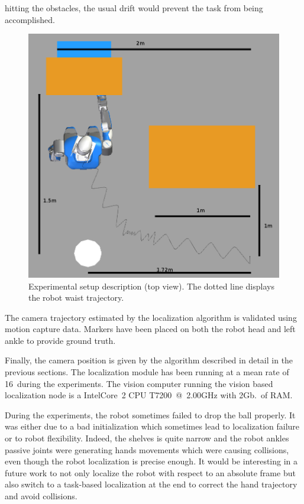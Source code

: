 hitting the obstacles, the usual drift would prevent the task from
being accomplished.
%
\begin{figure}[ht!]
  \begin{center}
    \includegraphics[width=\linewidth]{images/dimensions.png}
  \end{center}
  \caption{Experimental setup description (top view). The dotted line displays the robot waist trajectory.\label{fig:xp_setup_dim}}
\end{figure}
%
The camera trajectory estimated by the localization algorithm is validated using motion capture data. Markers have been placed on both the robot head and left ankle to provide ground truth.

Finally, the camera position is given by the algorithm described in detail in the previous sections. The localization module has been running at a mean rate of 16\hertz~during the experiments. The
vision computer running the vision based localization node is a Intel\textregistered Core\texttrademark\ 2 CPU T7200~@~2.00GHz with 2Gb.\ of RAM.

During the experiments, the robot sometimes failed to drop the ball properly. It was either due to a bad initialization which sometimes lead to localization failure or to robot flexibility. Indeed, the shelves is quite narrow and the robot ankles passive joints were generating hands movements which were causing collisions, even though the robot localization is precise enough. It would be interesting in a
future work to not only localize the robot with respect to an absolute frame but also switch to a task-based localization at the end to correct the hand trajectory and avoid collisions.

